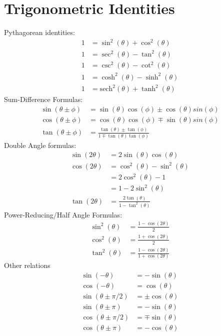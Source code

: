 \newpage
\section{Trigonometric Identities}
\begin{multicols}{2}
Pythagorean identities:
\begin{align}
1 &= \sin^2(\theta)+\cos^2(\theta)\\
1 &= \sec^2(\theta)-\tan^2(\theta) \\
1 &= \csc^2(\theta)-\cot^2(\theta) \\
1 &= \cosh^2(\theta)-\sinh^2(\theta) \\
1 &= \textrm{sech}^2(\theta)+\tanh^2(\theta)
\end{align}
Sum-Difference Formulas:
\begin{align}
\sin(\theta \pm \phi) &= \sin(\theta)\cos(\phi)\pm \cos(\theta)sin(\phi) \\
\cos(\theta \pm \phi) &= \cos(\theta)\cos(\phi)\mp \sin(\theta)sin(\phi) \\
\tan(\theta \pm \phi) &= \frac{\tan(\theta)\pm \tan (\phi)}{1 \mp \tan(\theta)\tan(\phi)}
\end{align}
Double Angle formulas:
\begin{align}
\sin(2\theta) &= 2\sin(\theta)\cos(\theta) \\
\cos(2\theta) &= \cos^2(\theta)-\sin^2(\theta)\\
&= 2\cos^2(\theta)-1 \\
&= 1 - 2\sin^2(\theta) \\
\tan(2\theta) &= \frac{2 \tan(\theta)}{1-\tan^2(\theta)}
\end{align}
Power-Reducing/Half Angle Formulas:
\begin{align}
\sin^2(\theta) &= \frac{1-\cos(2\theta)}{2}\\
\cos^2(\theta) &= \frac{1+\cos(2\theta)}{2}\\
\tan^2(\theta) &= \frac{1-\cos(2\theta)}{1+\cos(2\theta)}
\end{align}
Other relations
\begin{align}
\sin(-\theta) &=-\sin(\theta) \\
\cos(-\theta) &= \cos(\theta) \\
\sin(\theta\pm \pi/2) &= \pm \cos(\theta) \\
\sin(\theta\pm \pi) &= - \sin(\theta) \\
\cos(\theta\pm \pi/2) &= \mp \sin(\theta) \\
\cos(\theta\pm \pi) &= - \cos(\theta) 

\end{align}
\end{multicols}
